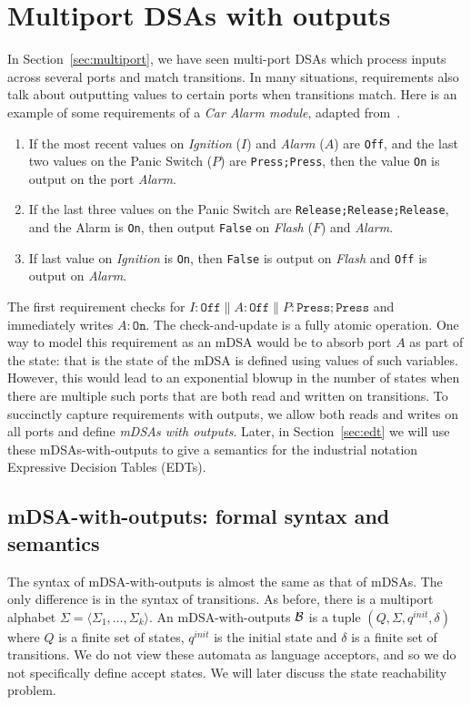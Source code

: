 \section{Multiport DSAs with outputs}
\label{sec:multiport-outputs}

In Section~\ref{sec:multiport}, we have seen multi-port DSAs which process inputs across several ports and match transitions. In many situations, requirements also talk about outputting values to certain ports when transitions match. Here is an example of some requirements of a \emph{Car Alarm module}, adapted from~\cite{DBLP:conf/enase/VenkateshSZA15a}. 
\begin{enumerate}
\item If the most recent values on \emph{Ignition} ($I$) and \emph{Alarm} ($A$) are \texttt{Off}, and the last two values on the Panic Switch ($P$) are \texttt{Press;Press}, then the value \texttt{On} is output on the port \emph{Alarm}.

\item If the last three values on the Panic Switch are \texttt{Release;Release;Release}, and the Alarm is \texttt{On}, then output \texttt{False} on \emph{Flash} ($F$)
and \emph{Alarm}.

\item If last value on \emph{Ignition} is \texttt{On}, then \texttt{False} is output on \emph{Flash} and \texttt{Off} is output on \emph{Alarm}.
\end{enumerate}

The first requirement checks for $I:\mathtt{Off} \parallel A:\mathtt{Off} \parallel P:\mathtt{Press;Press}$ and immediately writes $A: \mathtt{On}$. The check-and-update is a fully atomic operation. One way to model this requirement as an mDSA would be to absorb port $A$ as part of the state: that is the state of the mDSA is defined using values of such variables. However, this would lead to an exponential blowup in the number of states when there are multiple such ports that are both read and written on transitions. To succinctly capture requirements with outputs, we allow both reads and writes on all ports and define \emph{mDSAs with outputs}. Later, in Section~\ref{sec:edt} we will use these mDSAs-with-outputs to give a semantics for the industrial notation Expressive Decision Tables (EDTs).

\subsection{mDSA-with-outputs: formal syntax and semantics}
\label{sec:mdsao-synt}
The syntax of mDSA-with-outputs is almost the same as that of mDSAs. The only difference is in the syntax of transitions.  As before, there is a multiport alphabet $\Sigma = \langle \Sigma_1, \dots, \Sigma_k \rangle$. An mDSA-with-outputs $\mathcal{B}$ is a tuple $(Q, \Sigma, q^{init}, \delta)$ where $Q$ is a finite set of states, $q^{init}$ is the initial state and $\delta$ is a finite set of transitions. We do not view these automata as language acceptors, and so we do not specifically define accept states. We will later discuss the state reachability problem. 

